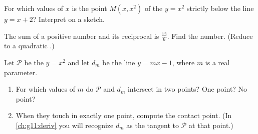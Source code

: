 \begin{exercise}[$\star\star$]\label{exo:g11:quad:9}
For which values of $x$ is the point $M(x, x^2)$ of the  $y = x^2$
strictly below the line $y = x + 2$? Interpret on a sketch.
\end{exercise}

\begin{exercise}[$\star\star$]\label{exo:g11:quad:10}
The sum of a positive number and its reciprocal is $\frac{13}{6}$. Find the
number. (Reduce to a quadratic .)
\end{exercise}

\begin{exercise}[$\star\star\star$]\label{exo:g11:quad:11}
Let $\mathcal P$ be the  $y = x^2$ and let $d_m$ be the line
$y = mx - 1$, where $m$ is a real parameter.
\begin{enumerate}
  \item For which values of $m$ do $\mathcal P$ and $d_m$ intersect in two
        points? One point? No point?
  \item When they touch in exactly one point, compute the contact point.
        (In \cref{ch:g11:deriv} you will recognize $d_m$ as the tangent to
        $\mathcal P$ at that point.)
\end{enumerate}
\end{exercise}

